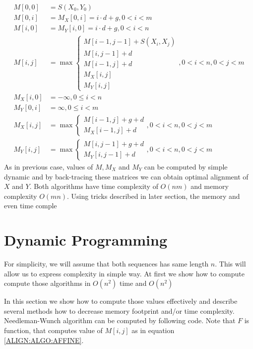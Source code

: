 \begin{align}
M[0,0] &= S(X_0,Y_0)\\
M[0,i] &= M_X[0,i] = i\cdot d+g, 0 < i < m\\
M[i,0] &= M_Y[i,0] = i\cdot d+g, 0 < i < n\\
M[i,j] &= \max
\begin{cases}
 M[i-1,j-1]+S(X_i,X_j)\\
 M[i,j-1]+d\\
 M[i-1,j]+d\\
 M_X[i,j]\\
 M_Y[i,j]
\end{cases}, 0<i<n,0<j<m\\
M_X[i,0] &= -\infty, 0\leq i< n\\
M_Y[0,i] &= \infty, 0 \leq i< m\\
M_X[i,j] &= \max
\begin{cases}
M[i-1,j]+g+d\\
M_X[i-1,j]+d
\end{cases}, 0<i<n,0<j<m\\
M_Y[i,j] &= \max
\begin{cases}
M[i,j-1]+g+d\\
M_Y[i,j-1]+d
\end{cases}, 0<i<n,0<j<m
\end{align}
As in previous case, values of $M,M_X$ and $M_Y$ can be computed by simple
dynamic and by back-tracing these matrices we can obtain optimal alignment of
$X$ and $Y$.
Both algorithms have time complexity of $O(nm)$ and memory complexity $O(mn)$.
Using tricks described in later section, the memory and even time comple

\section{Dynamic Programming}\label{DYNPROG}

For simplicity, we will assume that both sequences has same length $n$. This
will allow us to express complexity in simple way.  At first we show how
to compute compute those algorithms in $O(n^2)$ time and $O(n^2)$ 

In this section we show how to compute those values effectively and describe
several methods how to decrease memory footprint and/or time complexity.
Needleman-Wunch algorithm can be computed by following code. Note that $F$ is
function, that computes value of $M[i,j]$ as in equation
\ref{ALIGN:ALGO:AFFINE}.

